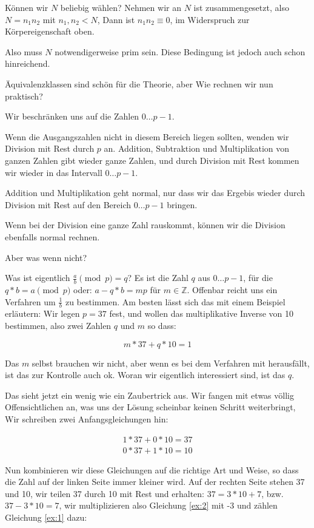 \documentclass{article}
\newcommand{\Z}{\mathbb{Z}}
\begin{document}
Können wir $N$ beliebig wählen? Nehmen wir an $N$ ist zusammengesetzt, also
$N = n_1 n_2$ mit $n_1, n_2 < N$, Dann ist $n_1 n_2 \equiv 0$, im Widerspruch zur
Körpereigenschaft oben.

Also muss $N$ notwendigerweise prim sein. Diese Bedingung ist jedoch auch
schon hinreichend.

Äquivalenzklassen sind schön für die Theorie, aber Wie rechnen wir nun
praktisch?

Wir beschränken uns auf die Zahlen $0 \ldots p-1$.

Wenn die Ausgangszahlen nicht in diesem Bereich liegen sollten, wenden wir
Division mit Rest durch $p$ an. Addition, Subtraktion und Multiplikation von
ganzen Zahlen gibt wieder ganze Zahlen, und durch Division mit Rest kommen wir
wieder in das Intervall $0 \ldots p-1$.

Addition und Multiplikation geht normal, nur dass wir das
Ergebis wieder durch Division mit Rest auf den Bereich $0 \ldots p-1$ bringen.

Wenn bei der Division eine ganze Zahl rauskommt, können wir die Division
ebenfalls normal rechnen.

Aber was wenn nicht?

Was ist eigentlich $\frac a b \pmod p = q$? Es ist die Zahl $q$ aus
$0 \ldots p-1$, für
die $q*b = a \pmod p$ oder:  $a - q*b = m p$ für $m \in \Z$. Offenbar reicht
uns ein Verfahren um $\frac 1 b$ zu bestimmen. Am besten lässt sich das mit
einem Beispiel erläutern: Wir legen $p=37$ fest, und wollen das multiplikative
Inverse von 10 bestimmen, also zwei Zahlen $q$ und $m$ so dass:

$$  m * 37 + q * 10 = 1 $$

Das $m$ selbst brauchen wir nicht, aber wenn es bei dem Verfahren mit
herausfällt, ist das zur Kontrolle auch ok. Woran wir eigentlich interessiert
sind, ist das $q$.

Das sieht jetzt ein wenig wie ein Zaubertrick aus. Wir fangen mit etwas völlig
Offensichtlichen an, was uns der Lösung scheinbar keinen Schritt weiterbringt,
Wir schreiben zwei Anfangsgleichungen hin:

\begin{eqnarray}
    1 * 37 + 0 * 10 = 37  \label{ex:1} \\
    0 * 37 + 1 * 10 = 10  \label{ex:2}
\end{eqnarray}

Nun kombinieren wir diese Gleichungen auf die richtige Art und Weise, so dass
die Zahl auf der linken Seite immer kleiner wird. Auf der rechten Seite stehen
37 und 10, wir teilen 37 durch 10 mit Rest und erhalten: $37 = 3*10 + 7$,
bzw. $37 - 3 * 10 = 7$, wir multiplizieren also Gleichung \eqref{ex:2} mit -3 und
zählen Gleichung \eqref{ex:1} dazu:
\end{document}
